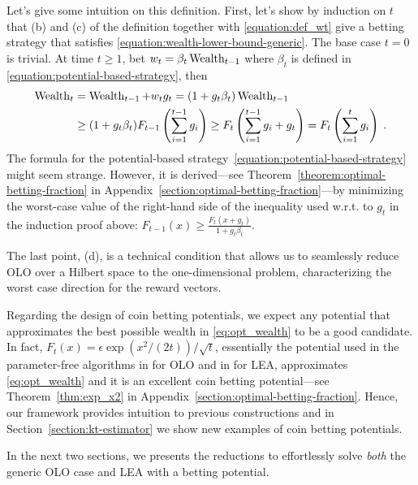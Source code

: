 Let's give some intuition on this definition.  First, let's show by induction
on $t$ that (b) and (c) of the definition together with \eqref{equation:def_wt} give a betting strategy that satisfies
\eqref{equation:wealth-lower-bound-generic}. The base case $t=0$ is trivial. At
time $t \ge 1$, bet $w_t=\beta_t \operatorname{Wealth}_{t-1}$
where $\beta_t$ is defined in \eqref{equation:potential-based-strategy}, then
\begin{align*}
\operatorname{Wealth}_t
&= \operatorname{Wealth}_{t-1} + w_t g_t
= (1+g_t \beta_t) \operatorname{Wealth}_{t-1} \\
&\ge (1 + g_t \beta_t) F_{t-1} \left(\sum_{i=1}^{t-1} g_i \right)
\ge F_t \left(\sum_{i=1}^{t-1} g_i + g_t \right)
= F_t \left( \sum_{i=1}^t g_i \right) \; .
\end{align*}
%
The formula for the potential-based
strategy~\eqref{equation:potential-based-strategy} might seem strange. However,
it is derived---see Theorem~\ref{theorem:optimal-betting-fraction}
in Appendix~\ref{section:optimal-betting-fraction}---by minimizing the
worst-case value of the right-hand side of the inequality used w.r.t. to $g_t$
in the induction proof above: $F_{t-1}(x) \ge \tfrac{F_{t}(x +
g_t)}{1+g_t\beta_t}$.

The last point, (d), is a technical condition that allows us to seamlessly
reduce OLO over a Hilbert space to the one-dimensional problem, characterizing
the worst case direction for the reward vectors.

Regarding the design of coin betting potentials, we expect any potential that
approximates the best possible wealth in \eqref{eq:opt_wealth} to be a good
candidate.  In fact, $F_t(x)=\epsilon \exp \left(x^2/(2t)\right)/\sqrt{t}$,
essentially the potential used in the parameter-free algorithms in
\cite{McMahan-Orabona-2014, Orabona-2014} for \ac{OLO} and in
\cite{Chaudhuri-Freund-Hsu-2009, Luo-Schapire-2014, Luo-Schapire-2015} for
\ac{LEA}, approximates \eqref{eq:opt_wealth} and it is an excellent coin
betting potential---see Theorem~\ref{thm:exp_x2} in
Appendix~\ref{section:optimal-betting-fraction}. Hence, our framework provides
intuition to previous constructions and in Section~\ref{section:kt-estimator}
we show new examples of coin betting potentials.

In the next two sections, we presents the reductions to effortlessly solve \emph{both} the generic \ac{OLO} case and \ac{LEA} with a betting potential.
